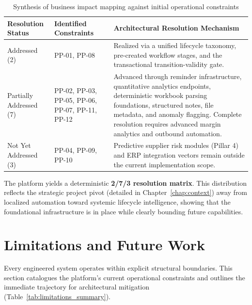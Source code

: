 \begin{table}[H]
\centering
\scriptsize
\renewcommand{\arraystretch}{1.3}
\begin{tabularx}{\textwidth}{|p{2.5cm}|p{2cm}|>{\RaggedRight\arraybackslash}X|}
\hline
\rowcolor{lightgray}
\textbf{Resolution Status} & \textbf{Identified Constraints} & \textbf{Architectural Resolution Mechanism} \\ \hline
Addressed (2) & PP-01, PP-08 & Realized via a unified lifecycle taxonomy, pre-created workflow stages, and the transactional transition-validity gate. \\ \hline
Partially Addressed (7) & PP-02, PP-03, PP-05, PP-06, PP-07, PP-11, PP-12 & Advanced through reminder infrastructure, quantitative analytics endpoints, deterministic workbook parsing foundations, structured notes, file metadata, and anomaly flagging. Complete resolution requires advanced margin analytics and outbound automation. \\ \hline
Not Yet Addressed (3) & PP-04, PP-09, PP-10 & Predictive supplier risk modules (Pillar 4) and ERP integration vectors remain outside the current implementation scope. \\ \hline
\end{tabularx}
\caption{Synthesis of business impact mapping against initial operational constraints}
\label{tab:business_impact_summary}
\end{table}

The platform yields a deterministic \textbf{2/7/3 resolution matrix}. This distribution reflects the strategic project pivot (detailed in Chapter~\ref{chap:context}) away from localized automation toward systemic lifecycle intelligence, showing that the foundational infrastructure is in place while clearly bounding future capabilities.

\section{Limitations and Future Work}\label{sec:limitations}
Every engineered system operates within explicit structural boundaries. This section catalogues the platform's current operational constraints and outlines the immediate trajectory for architectural mitigation (Table~\ref{tab:limitations_summary}).

